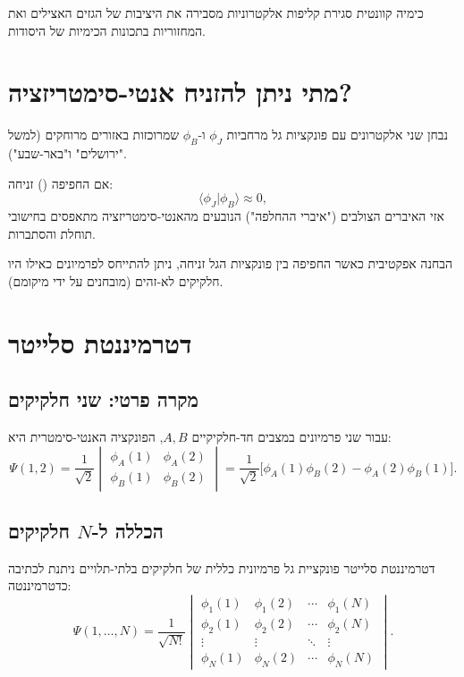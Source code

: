 \begin{resultbox}{כימיה קוונטית}
סגירת קליפות אלקטרוניות מסבירה את היציבות של הגזים האצילים ואת המחזוריות בתכונות הכימיות של היסודות.
\end{resultbox}



\section{מתי ניתן להזניח אנטי-סימטריזציה?}

נבחן שני אלקטרונים עם פונקציות גל מרחביות $\phi_J$ ו-$\phi_B$ שמרוכזות באזורים מרוחקים (למשל "ירושלים" ו"באר-שבע").

אם החפיפה () זניחה:
\[
\langle \phi_J | \phi_B \rangle \approx 0 ,
\]
אזי האיברים הצולבים ("איברי ההחלפה") הנובעים מהאנטי-סימטריזציה מתאפסים בחישובי תוחלת והסתברות.

\begin{mainbox}{הבחנה אפקטיבית}
כאשר החפיפה בין פונקציות הגל זניחה, ניתן להתייחס לפרמיונים כאילו היו חלקיקים לא-זהים (מובחנים על ידי מיקומם).
\end{mainbox}



\section{דטרמיננטת סלייטר}

\subsection{מקרה פרטי: שני חלקיקים}
עבור שני פרמיונים במצבים חד-חלקיקיים $A,B$, הפונקציה האנטי-סימטרית היא:
\[
\Psi(1,2)=\frac{1}{\sqrt{2}}
\begin{vmatrix}
\phi_A(1) & \phi_A(2) \\
\phi_B(1) & \phi_B(2)
\end{vmatrix}
=
\frac{1}{\sqrt{2}}\big[\phi_A(1)\phi_B(2)-\phi_A(2)\phi_B(1)\big].
\]

\subsection{הכללה ל-$N$ חלקיקים}

\begin{definitionbox}{דטרמיננטת סלייטר }
פונקציית גל פרמיונית כללית של חלקיקים בלתי-תלויים ניתנת לכתיבה כדטרמיננטה:
\[
\Psi(1,\dots,N)=\frac{1}{\sqrt{N!}}
\begin{vmatrix}
\phi_1(1) & \phi_1(2) & \cdots & \phi_1(N) \\
\phi_2(1) & \phi_2(2) & \cdots & \phi_2(N) \\
\vdots & \vdots & \ddots & \vdots \\
\phi_N(1) & \phi_N(2) & \cdots & \phi_N(N)
\end{vmatrix}.
\]
\end{definitionbox}



